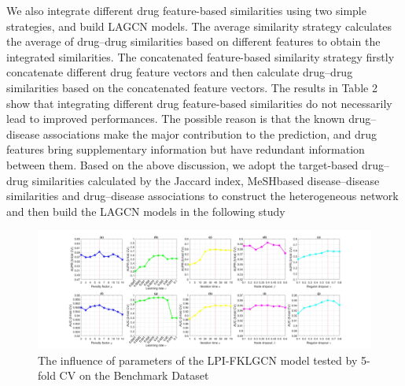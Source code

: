 \documentclass[fleqn,10pt]{wlscirep}
\begin{document}
We also integrate different drug feature-based similarities using two simple strategies, and build LAGCN models. The average similarity strategy calculates the average of drug–drug similarities based on different features to obtain the integrated similarities. The concatenated feature-based similarity strategy firstly concatenate different drug feature vectors and then calculate drug–drug similarities based on the concatenated feature vectors. The results in Table 2 show that integrating different drug feature-based similarities do not necessarily lead to improved performances. The possible reason is that the known drug–disease associations make the major contribution to the prediction, and drug features bring supplementary information but have redundant information between them. Based on the above discussion, we adopt the target-based drug–drug similarities calculated by the Jaccard index, MeSHbased disease–disease similarities and drug–disease associations to construct the heterogeneous network and then build the LAGCN models in the following study

\begin{figure}[ht]
\centering
\graphicspath{ {./images/} }
\includegraphics[width=\textwidth]{fig1.jpg}
\caption{The influence of parameters of the LPI-FKLGCN model tested by 5-fold CV on the Benchmark Dataset}
\label{fig:fig2-1}
\end{figure}

\end{document}
